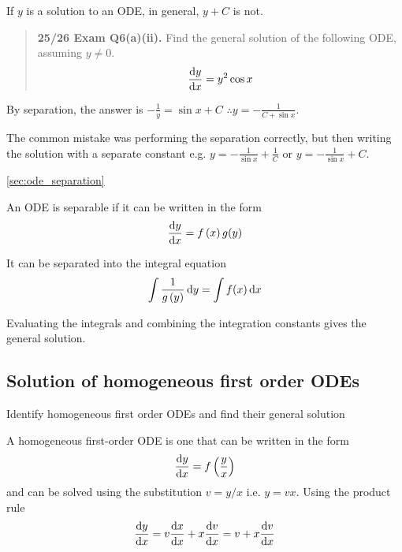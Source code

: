 
\begin{exammistake}

If $y$ is a solution to an ODE, in general, $y+C$ is not.
\begin{quote}
    \textbf{25/26 Exam Q6(a)(ii).} Find the general solution of the following ODE, assuming $y\neq0$.
    \[
    \frac{{\rm d} y}{{\rm d} x}={y}^{2}\cos x
    \]
\end{quote}
By separation, the answer is $-\frac{1}{y}=\sin x+C$ $\therefore y=-\frac{1}{C+\sin x}$.

The common mistake was performing the separation correctly, but then writing the solution with a separate constant e.g. $y=-\frac{1}{\sin x}+\frac{1}{C}$ or $y=-\frac{1}{\sin x}+C$.
\end{exammistake}


\begin{recap}{\ref{sec:ode_separation}}

\item An ODE is separable if it can be written in the form
\[
\frac{{\rm d} y}{{\rm d} x}=f\left(x\right)g(y)
\]

\item It can be separated into the integral equation
\[
\int \frac{1}{g\left(y\right)}\, {\rm d}y=\int f(x)\, {\rm d}x
\]

\item Evaluating the integrals and combining the integration constants gives the general solution.

\end{recap}


\newtexpage
\subsection{Solution of homogeneous first order ODEs}
\label{sec:ode_homogeneous}

\begin{learningoutcomes}
\item Identify homogeneous first order ODEs and find their general solution
\end{learningoutcomes}


A homogeneous first-order ODE is one that can be written in the form
\[
\frac{{\rm d} y}{{\rm d} x}=f\left(\frac{y}{x}\right)
\]
and can be solved using the substitution $v=y/x$ i.e. $y=vx$. Using the product rule
\[
\frac{{\rm d} y}{{\rm d} x}=v\frac{{\rm d} x}{{\rm d} x}+x\frac{{\rm d} v}{{\rm d} x}=v+x\frac{{\rm d} v}{{\rm d} x}
\]

